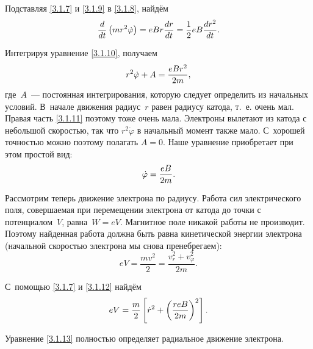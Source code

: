 Подставляя \eqref{3.1.7} и \eqref{3.1.9} в \eqref{3.1.8}, найдём
\begin{equation}
\frac{d}{dt}\left(mr^2\dot{\varphi}\right)=eBr\frac{dr}{dt}=
\frac12eB\frac{dr^2}{dt}.
	\eqmark{3.1.10}
\end{equation}

Интегрируя уравнение \eqref{3.1.10}, получаем
\begin{equation}
	r^2\dot{\varphi}+A=\frac{eBr^2}{2m},
	\eqmark{3.1.11}
\end{equation}
где~$A$~--- постоянная интегрирования, которую следует определить из начальных
условий. В~начале движения радиус~$r$ равен радиусу катода, т.~е. очень мал.
Правая часть \eqref{3.1.11} поэтому тоже очень мала. Электроны вылетают из
катода с небольшой скоростью, так что $r^{2}\dot{\varphi}$ в начальный момент
также мало. С~хорошей точностью можно поэтому полагать $A=0$. Наше уравнение
приобретает при этом простой вид:
\begin{equation}
	\dot{\varphi}=\frac{eB}{2m}.
	\eqmark{3.1.12}
\end{equation}

Рассмотрим теперь движение электрона по радиусу. Работа сил электрического поля,
совершаемая при перемещении электрона от катода до точки с потенциалом~$V$,
равна~$W=eV$. Магнитное поле никакой работы не производит. Поэтому найденная
работа должна быть равна кинетической энергии электрона (начальной скоростью
электрона мы снова пренебрегаем):
\begin{equation*}
	eV=\frac{mv^2}{2}=\frac{v_r^2+v_\varphi^2}{2m}.
\end{equation*}

С~помощью \eqref{3.1.7} и \eqref{3.1.12} найдём
\begin{equation}
	eV=\frac{m}{2}\left[\dot{r}^2+\left(\frac{reB}{2m}\right)^2\right].
	\eqmark{3.1.13}
\end{equation}

Уравнение \eqref{3.1.13} полностью определяет радиальное движение электрона.



